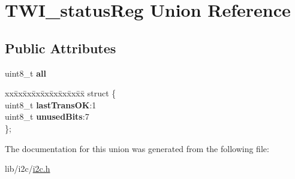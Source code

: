 \hypertarget{union_t_w_i__status_reg}{}\section{T\+W\+I\+\_\+status\+Reg Union Reference}
\label{union_t_w_i__status_reg}
\subsection*{Public Attributes}
\begin{DoxyCompactItemize}
\item 
\hypertarget{union_t_w_i__status_reg_a8f2427c1731d117f083e1923283b64ca}{}\label{union_t_w_i__status_reg_a8f2427c1731d117f083e1923283b64ca} 
uint8\+\_\+t {\bfseries all}
\item 
\hypertarget{union_t_w_i__status_reg_add7d1a7a0e0ddd8a960f89dd9aa97b0f}{}\label{union_t_w_i__status_reg_add7d1a7a0e0ddd8a960f89dd9aa97b0f} 
\begin{tabbing}
xx\=xx\=xx\=xx\=xx\=xx\=xx\=xx\=xx\=\kill
struct \{\\
\>uint8\_t {\bfseries lastTransOK}:1\\
\>uint8\_t {\bfseries unusedBits}:7\\
\}; \\

\end{tabbing}\end{DoxyCompactItemize}


The documentation for this union was generated from the following file\+:\begin{DoxyCompactItemize}
\item 
lib/i2c/\hyperlink{i2c_8h}{i2c.\+h}\end{DoxyCompactItemize}
